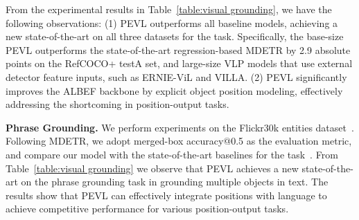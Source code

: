 \documentclass[11pt]{article}
\begin{document}
\begin{table*}[!t]
\centering
{}
\caption{Ablation results. PT: prompt tuning, OAO: ordering-aware objective, Pos: position tokens.}
\label{table:ablation}
\end{table*}



From the experimental results in Table~\ref{table:visual grounding}, we have the following observations: (1) PEVL outperforms all baseline models, achieving a new state-of-the-art on all three datasets for the task. Specifically, the base-size PEVL outperforms the state-of-the-art regression-based MDETR by 2.9 absolute points on the RefCOCO+ testA set, and large-size VLP models that use external detector feature inputs, such as ERNIE-ViL and VILLA. (2) PEVL significantly improves the ALBEF backbone by explicit object position modeling, effectively addressing the shortcoming in position-output tasks.









\textbf{Phrase Grounding.}
We perform experiments on the Flickr30k entities dataset~\cite{plummer2015flickr30k}. Following MDETR, we adopt merged-box accuracy@0.5 as the evaluation metric, and compare our model with the state-of-the-art baselines for the task~\cite{kamath2021mdetr,yang2021crossing}. From Table~\ref{table:visual grounding} we observe that PEVL achieves a new state-of-the-art on the phrase grounding task in grounding multiple objects in text. The results show that PEVL can effectively integrate positions with language to achieve competitive performance for various position-output tasks.
\end{document}
